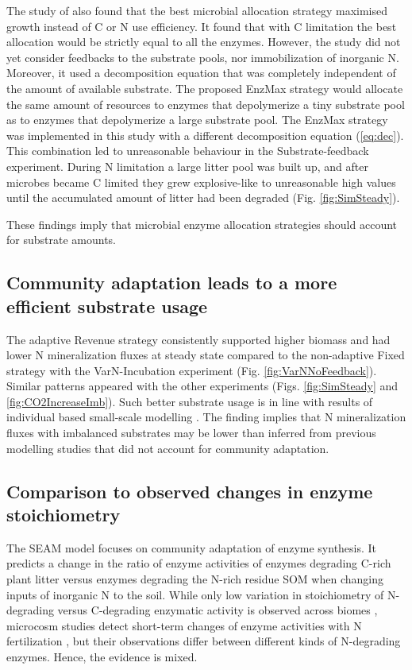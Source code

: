 The study of \citet{Averill14} also found that the best microbial allocation
strategy maximised growth instead of C or N use efficiency. It found that with C
limitation the best allocation would be strictly equal to all the enzymes.
However, the study did not yet consider feedbacks to the substrate pools, nor
immobilization of inorganic N. Moreover, it used a decomposition equation that
was completely independent of the amount of available substrate. The proposed
EnzMax strategy would allocate the same amount of resources to enzymes that
depolymerize a tiny substrate pool as to enzymes that depolymerize a large
substrate pool.
The EnzMax strategy was implemented in this study with a different decomposition
equation (\ref{eq:dec}). This combination led to unreasonable behaviour in the
Substrate-feedback experiment. During N limitation a large litter pool was built
up, and after microbes became C limited they grew explosive-like to unreasonable
high values until the accumulated amount of litter had been degraded (Fig.
\ref{fig:SimSteady}).

These findings imply that microbial enzyme allocation strategies should
account for substrate amounts.

\subsection{Community adaptation leads to a more efficient substrate usage}
The adaptive Revenue strategy consistently supported higher biomass and had
lower N mineralization fluxes at steady state compared to the non-adaptive
Fixed strategy with the VarN-Incubation experiment (Fig.
\ref{fig:VarNNoFeedback}). Similar patterns appeared with the other experiments
(Figs. \ref{fig:SimSteady} and \ref{fig:CO2IncreaseImb}). Such better substrate
usage is in line with results of individual based small-scale modelling
\citep{Kaiser14}.
The finding implies that N mineralization fluxes with imbalanced substrates may
be lower than inferred from previous modelling studies that did not account for
community adaptation.

\subsection{Comparison to observed changes in enzyme stoichiometry}
 
The SEAM model focuses on community adaptation of enzyme synthesis. It predicts
a change in the ratio of enzyme activities of enzymes degrading C-rich plant
litter versus enzymes degrading the N-rich residue SOM when changing inputs of
inorganic N to the soil.
While only low variation in stoichiometry of N-degrading versus C-degrading
enzymatic activity is observed across biomes \citep{Sinsabaugh09}, microcosm
studies detect short-term changes of enzyme activities with N fertilization
\citep{Kumar16}, but their observations differ between different kinds of
N-degrading enzymes. Hence, the evidence is mixed.

